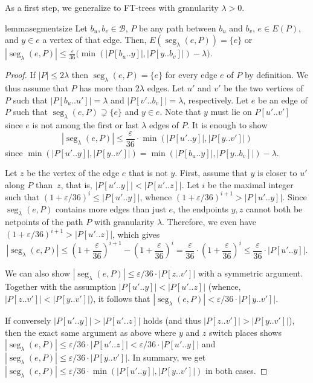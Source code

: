 \documentclass{article}\usepackage[a4paper,margin=20mm]{geometry}
\newcommand*{\B}{\mathcal{B}}
\DeclareMathOperator{\seg}{seg}
\newcommand*{\length}[1]{|#1|}
\renewcommand{\le}{\leqslant}
\newcommand{\eps}{\varepsilon}
\begin{document}
As a first step, we generalize 
to FT-trees with granularity $\lambda > 0$.

\begin{restatable}{lemma}{segmentsize}
\label{lemma:segment-size} 
  Let $b_u, b_v \in \B$,
  $P$ be any path between $b_u$ and $b_v$, $e \in E(P)$,
  and $y \in e$ a vertex of that edge.
  Then, $E(\seg_{\lambda}(e,P)) = \{e\}$ or 
  $\length{\seg_{\lambda}(e,P)}  
  	\le \frac{\eps}{36} \big(\min(\length{P[b_u..y]}, \length{P[y..b_v]}) - \lambda \big)$. 
\end{restatable}

\begin{proof}
If $|P| \le 2\lambda$ then $\seg_\lambda(e,P) = \{e\}$ for every edge $e$ of $P$ by definition.
We thus assume that $P$ has more than $2\lambda$ edges.
Let $u'$ and $v'$ be the two vertices of $P$ such that $\length{P[b_u..u']}=\lambda$ and $\length{P[v'..b_v]} = \lambda$, respectively. 
Let $e$ be an edge of $P$ such that $\seg_\lambda(e,P) \supsetneq \{e\}$ and $y \in e$.
Note that $y$ must lie on $P[u'..v']$ since $e$ is not among the first or last $\lambda$
edges of $P$.
It is enough to show
\begin{equation*}
	\length{\seg_\lambda(e,P)} \le \frac{\eps}{36} \cdot \min(\length{P[u'..y]}, \length{P[y..v']})
\end{equation*}
since 
$\min(\length{P[u'..y]}, \length{P[y..v']}) = \min(\length{P[b_u..y]}, \length{P[y..b_v]}) - \lambda$.

Let $z$ be the vertex of the edge $e$ that is not $y$.
First, assume that $y$ is closer to $u'$ along $P$ than~$z$,
that is, $|P[u'..y]| < |P[u'.. z]|$.
Let $i$ be the maximal integer such that $(1+\eps/36)^i \le \length{P[u'..y]}$,
whence $(1+\eps/36)^{i+1}>\length{P[u'..y]}$.
Since $\seg_\lambda(e,P)$ contains more edges than just $e$,
the endpoints $y,z$ cannot both be netpoints of the path $P$
with granularity $\lambda$.
Therefore, we even have $(1+\eps/36)^{i+1} > \length{P[u'..z]}$,
which gives
\begin{equation*}
	|\seg_\lambda(e,P)| \le \left(1+\frac{\eps}{36}\right)^{i+1} - \left(1+ \frac{\eps}{36}\right)^i
	 = \frac{\eps}{36} \cdot \left(1+\frac{\eps}{36}\right)^i
	  \le \frac{\eps}{36} \cdot |P[u'..y]|.
\end{equation*}

We can also show $\length{\seg_\lambda(e,P)} \le \eps/36 \cdot \length{P[z..v']}$ with a symmetric argument.
Together with the assumption $|P[u'..y]| < |P[u'.. z]|$ (whence, $\length{P[z..v']} < \length{P[y..v']}$),
it follows that $\length{\seg_\lambda(e,P)} < \eps/36 \cdot \length{P[y..v']}$.

If conversely $|P[u'..y]| > |P[u'.. z]|$ holds (and thus $\length{P[z..v']} > \length{P[y..v']}$),
then the exact same argument as above where $y$ and $z$ switch places
shows $|\seg_\lambda(e,P)| \le \eps/36 \cdot |P[u'..z]| < \eps/36 \cdot |P[u'..y]|$
and $\length{\seg_\lambda(e,P)} \le \eps/36 \cdot \length{P[y..v']}$.
In summary, we get
$\length{\seg_\lambda(e,P)} \le \eps/36 \cdot \min(\length{P[u'..y]}, \length{P[y..v']})$
in both cases.
\end{proof}
\end{document}

